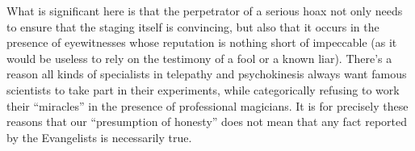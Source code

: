 What is significant here is that the perpetrator of a serious hoax not only needs to ensure that the staging itself is convincing, but also that it occurs in the presence of eyewitnesses whose reputation is nothing short of impeccable (as it would be useless to rely on the testimony of a fool or a known liar). There's a reason all kinds of specialists in telepathy and psychokinesis always want famous scientists to take part in their experiments, while categorically refusing to work their ``miracles'' in the presence of professional magicians. It is for precisely these reasons that our ``presumption of honesty'' does not mean that any fact reported by the Evangelists is necessarily true.